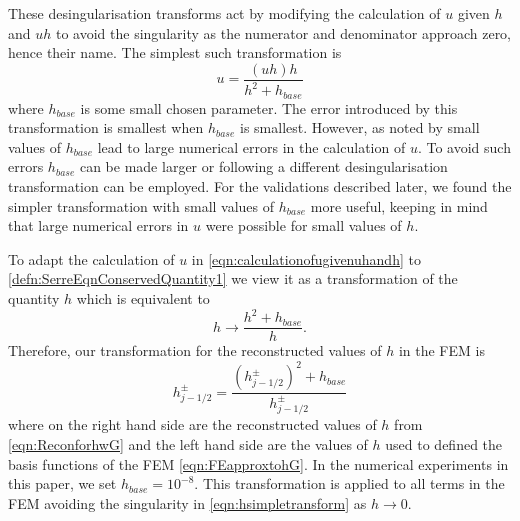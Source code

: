 \documentclass[AMA,STIX1COL]{WileyNJD-v2}
\begin{document}
These desingularisation transforms act by modifying the calculation of $u$ given $h$ and $uh$ to avoid the singularity as the numerator and denominator approach zero, hence their name. The simplest such transformation is
\begin{equation}
u = \frac{(uh) h}{h^2 + h_{base}}
\label{eqn:calculationofugivenuhandh}
\end{equation}
where $h_{base}$ is some small chosen parameter. The error introduced by this transformation is smallest when $h_{base}$ is smallest. However, as noted by \citet{Kurganov-Petrova-2007-707} small values of $h_{base}$ lead to large numerical errors in the calculation of $u$. To avoid such errors $h_{base}$ can be made larger or following \citet{Kurganov-Petrova-2007-707} a different desingularisation transformation can be employed. For the validations described later, we found the simpler transformation with small values of $h_{base}$ more useful, keeping in mind that large numerical errors in $u$ were possible for small values of $h$. 

To adapt the calculation of $u$ in \eqref{eqn:calculationofugivenuhandh} to \eqref{defn:SerreEqnConservedQuantity1} we view it as a transformation of the quantity $h$ which is equivalent to
\begin{equation}
\label{eqn:hsimpletransform}
h \rightarrow  \frac{h^2 + h_{base}}{h}.
\end{equation}
Therefore, our transformation for the reconstructed values of $h$ in the FEM is
\begin{equation}
\label{eqn:hdrytransform}
h^\pm_{j-1/2}  = \frac{ \left(h^\pm_{j-1/2} \right)^2  + h_{base}}{h^\pm_{j-1/2}}
\end{equation} 
where on the right hand side are the reconstructed values of $h$ from \eqref{eqn:ReconforhwG} and the left hand side are the values of $h$ used to defined the basis functions of the FEM \eqref{eqn:FEapproxtohG}. In the numerical experiments in this paper, we set $h_{base} = 10^{-8}$. This transformation is applied to all terms in the FEM avoiding the singularity in \eqref{eqn:hsimpletransform} as $h \rightarrow 0$.
\end{document}
